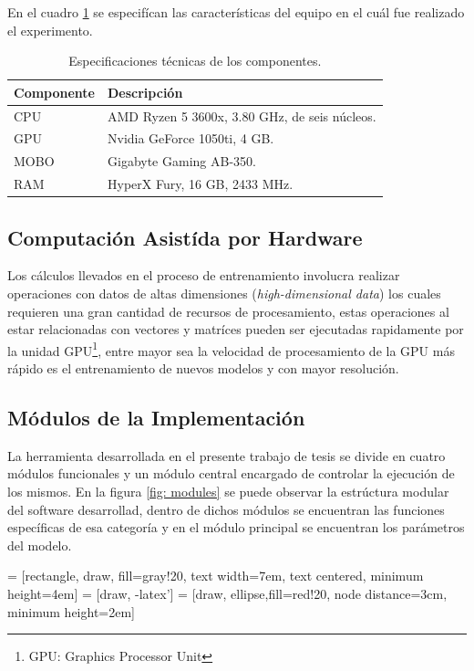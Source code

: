 En el cuadro \ref{tab:specs} se especifícan las características del equipo en el cuál fue realizado el experimento.

\begin{table}[H]
    \centering
    \caption{Especificaciones técnicas de los componentes.}
    \begin{tabular}{|l|l|}
        \hline
        \bf{Componente} & \bf{Descripción} \\
        \hline
        CPU & AMD Ryzen 5 3600x, 3.80 GHz, de seis núcleos.\\
        \hline
        GPU & Nvidia GeForce 1050ti, 4 GB. \\
        \hline
        MOBO & Gigabyte Gaming AB-350. \\
        \hline
        RAM & HyperX Fury, 16 GB, 2433 MHz. \\
        \hline
    \end{tabular}
    \label{tab:specs}
\end{table}
\subsection{Computación Asistída por Hardware}
Los cálculos llevados en el proceso de entrenamiento involucra realizar operaciones con datos de altas dimensiones (\emph{high-dimensional data}) los cuales requieren una gran cantidad de recursos de procesamiento, estas operaciones al estar relacionadas con vectores y matríces pueden ser ejecutadas rapidamente por la unidad GPU\footnote{GPU: Graphics Processor Unit}, entre mayor sea la velocidad de procesamiento de la GPU más rápido es el entrenamiento de nuevos modelos y con mayor resolución.

\subsection{Módulos de la Implementación}
La herramienta desarrollada en el presente trabajo de tesis se divide en cuatro módulos funcionales y un módulo central encargado de controlar la ejecución de los mismos. En la figura \ref{fig: modules} se puede observar la estrúctura modular del software desarrollad, dentro de dichos módulos se encuentran las funciones específicas de esa categoría y en el módulo principal se encuentran los parámetros del modelo.

 = [rectangle, draw, fill=gray!20, 
    text width=7em, text centered, minimum height=4em]
 = [draw, -latex']
 = [draw, ellipse,fill=red!20, node distance=3cm,
    minimum height=2em]

